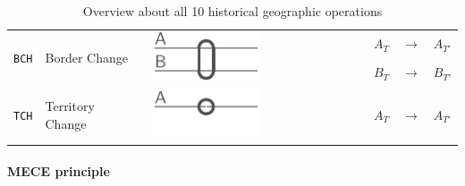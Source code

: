\begin{table}[!h]
\begin{center}
\begin{tabular}{m{0.65cm} m{2.5cm} m{2.2cm}
                m{0.35cm} m{0.3cm} m{0.35cm} m{0.01cm}
                m{0.35cm} m{0.3cm} m{0.35cm} m{0.01cm}
                m{0.35cm} m{0.3cm} m{0.88cm}}
  \midrule
  \multirow{2}{*}{\texttt{BCH}} &
  \multirow{2}{*}{Border Change} &
  \multirow{2}{*}{\includegraphics{graphics/concept/operations/BCH}} &
  & & & &
  & & & &
  $ A_T $ & $ \rightarrow $ & $ A_{T'} $ \\
  & & &
  & & & &
  & & & &
  $ B_T $ & $ \rightarrow $ & $ B_{T'} $ \footnotemark \\

  \midrule
  \multirow{1}{*}{\texttt{TCH}} &
  \multirow{1}{*}{Territory Change} &
  \multirow{1}{*}{\includegraphics{graphics/concept/operations/NCH_TCH}} &
  & & & &
  & & & &
  $ A_T $ & $ \rightarrow $ & $ A_{T'} $ \\

  \bottomrule
\end{tabular}
\caption{Overview about all 10 historical geographic operations}
\label{tab:historical_geographic_operations}
\end{center}
\end{table}

\addtocounter{footnote}{-4}
\addtocounter{footnote}{1}
\addtocounter{footnote}{1}
\addtocounter{footnote}{1}
\addtocounter{footnote}{1}


\paragraph{MECE principle} %
\label{par:mece_principle}

